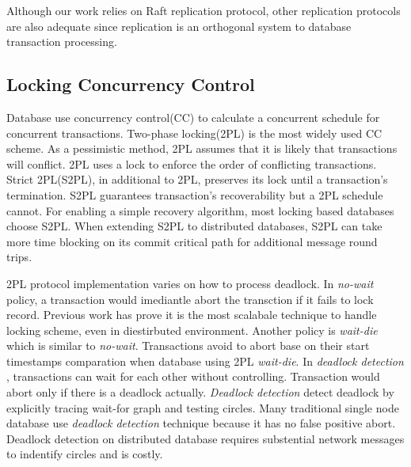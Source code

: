 \documentclass[conference]{IEEEtran}
\begin{document}
Although our work relies on Raft replication protocol, other replication protocols are also adequate since replication is an orthogonal system to database transaction processing.




\subsection{Locking Concurrency Control}
Database use concurrency control(CC) to calculate a concurrent schedule for concurrent transactions.
Two-phase locking(2PL) is the most widely used CC scheme.
As a pessimistic method, 2PL assumes that it is likely that transactions will conflict.
2PL uses a lock to enforce the order of conflicting transactions.
Strict 2PL(S2PL), in additional to 2PL, preserves its lock until a transaction's termination.
S2PL guarantees transaction's recoverability but a 2PL schedule cannot.
For enabling a simple recovery algorithm, most locking based databases choose S2PL.
When extending S2PL to distributed databases, S2PL can take more time blocking on its commit critical path for additional message round trips.

2PL protocol implementation varies on how to process deadlock.
In \emph{no-wait}
\cite{EvaluationOfCC:journals/pvldb/HardingAPS17}
policy, a transaction would imediantle abort the transction if it 
 fails to lock record. 
Previous work has prove it is the most scalabale technique to handle locking scheme, even in diestirbuted environment\cite{EvaluationCC1000Cores:journals/pvldb/YuBPDS14}\cite{EvaluationOfCC:journals/pvldb/HardingAPS17}.
Another policy is \emph{wait-die} \cite{LockNoWait:journals/csur/BernsteinG81} which is similar to \emph{no-wait}.
Transactions avoid to abort base on their start timestamps comparation when database using 2PL \emph{wait-die}.
In \emph{deadlock detection} \cite{LockCC:conf/ds/GrayLPT76},
transactions can wait for each other without controlling.
Transaction would abort only if there is a deadlock actually.
\emph{Deadlock detection} detect deadlock by explicitly tracing wait-for graph and testing circles.
Many traditional single node database\cite{MySQL}\cite{PostgreSQL} use \emph{deadlock detection} technique because it has no false positive abort. 
Deadlock detection on distributed database requires substential network messages to indentify circles and is  costly.
\end{document}
